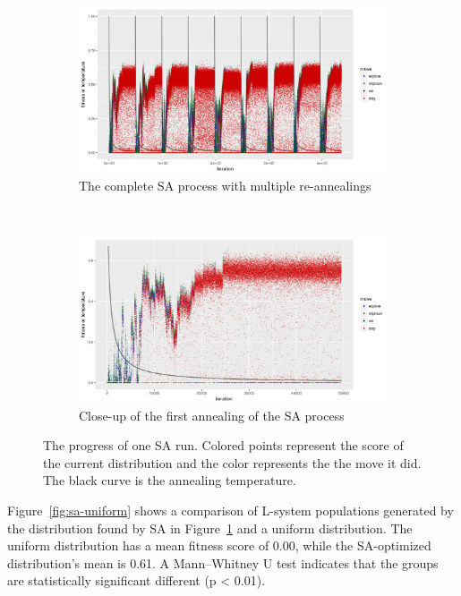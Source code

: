 \begin{figure}
    \centering
    \begin{subfigure}{1.0\textwidth}
        \includegraphics[width=\textwidth]{figures/sa-progress}
        \caption{The complete SA process with multiple re-annealings}
        \label{fig:sa-progress}
    \end{subfigure}
    \\
    \begin{subfigure}{1.0\textwidth}
        \includegraphics[width=\textwidth]{figures/sa-progress-close}
        \caption{Close-up of the first annealing of the SA process}
        \label{fig:sa-progress-close}
    \end{subfigure}
    \caption[The progress of one SA run]{The progress of one SA run. Colored points represent the score of the current distribution and the color represents the the move it did. The black curve is the annealing temperature.}
\end{figure}

Figure~\ref{fig:sa-uniform} shows a comparison of L-system populations generated by the distribution found by SA in Figure~\ref{fig:sa-progress} and a uniform distribution.
The uniform distribution has a mean fitness score of 0.00, while the SA-optimized distribution's mean is 0.61.
A Mann–Whitney U test indicates that the groups are statistically significant different (p < 0.01).

